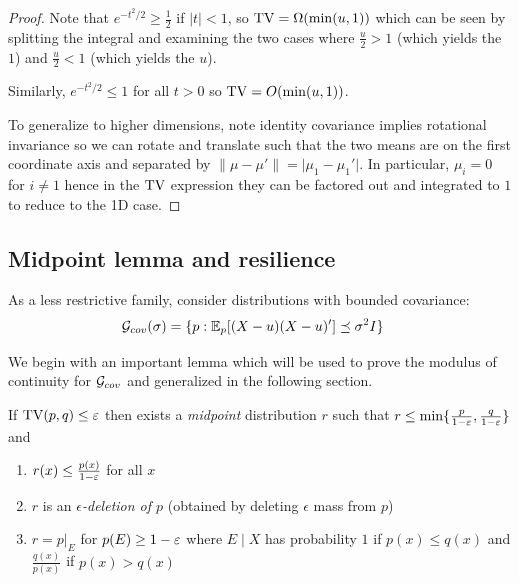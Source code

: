 \begin{proof}
    Note that $e^{-t^2/2} \geq \frac{1}{2}$ if $\lvert t \rvert < 1$, so $\operatorname{TV} = \Omega(\min(u,1))$
    which can be seen by splitting the integral and examining the two cases where
    $\frac{u}{2} > 1$ (which yields the $1$) and $\frac{u}{2} < 1$ (which yields the $u$).

    Similarly, $e^{-t^2/2} \leq 1$ for all $t > 0$ so $\operatorname{TV} = O(\min(u,1))$.

    To generalize to higher dimensions, note identity covariance implies rotational invariance so we can
    rotate and translate such that the two means are on the first coordinate axis and separated
    by $\|\mu - \mu'\| = \lvert \mu_1 - \mu_1' \rvert$. In particular, $\mu_i = 0$ for $i \neq 1$ hence
    in the $\operatorname{TV}$ expression they can be factored out and integrated to $1$ to reduce to the 1D case.
\end{proof}

\subsection{Midpoint lemma and resilience}

As a less restrictive family, consider distributions with bounded covariance:
\begin{align}
    \mathcal{G}_{cov}(\sigma)
    &= \{ p : \mathbb{E}_p[(X - u)(X - u)'] \preceq \sigma^2 I\}
\end{align}

We begin with an important lemma which will be used to prove the modulus of continuity for $\mathcal{G}_{cov}$
and generalized in the following section.
\begin{lemma}\label{lem:midpoint}
    If $\operatorname{TV}(p,q) \leq \varepsilon$ then exists a \emph{midpoint} distribution $r$ such that
    $r \leq \min\{\frac{p}{1 - \varepsilon}, \frac{q}{1 - \varepsilon}\}$ and
    \begin{enumerate}
        \item $r(x) \leq \frac{p(x)}{1 - \varepsilon}$ for all $x$
        \item $r$ is an \emph{$\epsilon$-deletion of $p$} (obtained by deleting $\epsilon$ mass from $p$)
        \item $r = p \vert_{E}$ for $p(E) \geq 1 - \varepsilon$ where $E \mid X$ has probability $1$ if $p(x) \leq q(x)$ and $\frac{q(x)}{p(x)}$ if $p(x) > q(x)$
    \end{enumerate}
\end{lemma}

